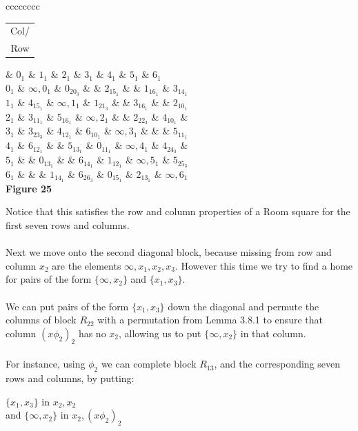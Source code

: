 \documentclass[
  12pt,
  a4paper]{book}
\begin{document}
{\textbar c\textbar c\textbar c\textbar c\textbar c\textbar c\textbar c\textbar c\textbar{}}

\begin{longtable}[]{@{}c@{}}
\toprule
\endhead
Col/\tabularnewline
Row\tabularnewline
\bottomrule
\end{longtable}

\& \(0_1\) \& \(1_1\) \& \(2_1\) \& \(3_1\) \& \(4_1\) \& \(5_1\) \& \(6_1\)\\
\(0_1\) \& \(\infty,0_1\) \& \(0_20_3\) \& \& \(2_15_1\) \& \& \(1_16_1\) \& \(3_14_1\)\\
\(1_1\) \& \(4_15_1\) \& \(\infty, 1_1\) \& \(1_21_3\) \& \& \(3_16_1\) \& \& \(2_10_1\)\\
\(2_1\) \& \(3_11_1\) \& \(5_16_1\) \& \(\infty,2_1\) \& \& \(2_22_3\) \& \(4_10_1\) \&\\
\(3_1\) \& \(3_23_3\) \& \(4_12_1\) \& \(6_10_1\) \& \(\infty,3_1\) \& \& \& \(5_11_1\)\\
\(4_1\) \& \(6_12_1\) \& \& \(5_13_1\) \& \(0_11_1\) \& \(\infty,4_1\) \& \(4_24_3\) \&\\
\(5_1\) \& \& \(0_13_1\) \& \& \(6_14_1\) \& \(1_12_1\) \& \(\infty,5_1\) \& \(5_25_3\)\\
\(6_1\) \& \& \& \(1_14_1\) \& \(6_26_3\) \& \(0_15_1\) \& \(2_13_1\) \& \(\infty,6_1\)\\

\textbf{Figure 25}

Notice that this satisfies the row and column properties of a Room
square for the first seven rows and columns.\\
~\\
Next we move onto the second diagonal block, because missing from row
and column \(x_2\) are the elements \(\infty, x_1,x_2,x_3\). However this
time we try to find a home for pairs of the form \(\{\infty,x_2\}\) and
\(\{x_1,x_3\}\).\\
~\\
We can put pairs of the form \(\{x_1,x_3\}\) down the diagonal and permute
the columns of block \(R_{22}\) with a permutation from Lemma 3.8.1 to
ensure that column \((x\phi _2)_2\) has no \(x_2\), allowing us to put
\(\{\infty,x_2\}\) in that column.\\
~\\
For instance, using \(\phi _2\) we can complete block \(R_{13}\), and the
corresponding seven rows and columns, by putting:

\(\{x_1,x_3\}\) in \(x_2,x_2\)\\
and \(\{\infty,x_2\}\) in \(x_2,(x \phi _2)_2\)\\
\end{document}

